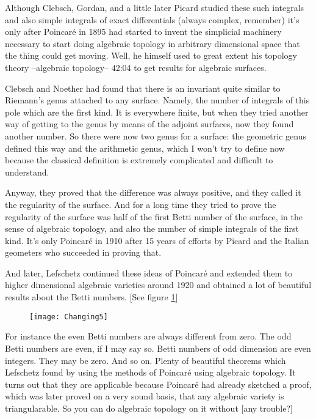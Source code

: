 \documentclass{article}
\begin{document}
Although Clebsch, Gordan, and a little later Picard studied these such integrals
and also simple integrals of exact differentials
(always complex, remember)
it's only after Poincar\'e in 1895 had started to invent the simplicial machinery
necessary to start doing algebraic topology in arbitrary dimensional space 
that the thing could get moving.
Well, he himself used to great extent his topology theory
--algebraic topology--
42:04
to get results for algebraic surfaces.

Clebsch and Noether had found that 
there is an invariant quite similar to Riemann's genus 
attached to any surface.
Namely, the number of integrals of this pole which are the first kind.
It is everywhere finite,
but when they tried another way of getting to the genus 
by means of the adjoint surfaces,
now they found another number.
So there were now two genus for a surface:
the geometric genus defined this way
and the arithmetic genus, 
which I won't try to define now because 
the classical definition is extremely complicated and difficult to understand.

Anyway, they proved that the difference was always positive,
and they called it the regularity of the surface.
And for a long time they tried to prove the regularity of the surface
was half of the first Betti number of the surface,
in the sense of algebraic topology,
and also the number of simple integrals of the first kind.
It's only Poincar\'e in 1910 after 15 years of efforts
by Picard and the Italian geometers
who succeeded in proving that.

And later, Lefschetz continued these ideas of Poincar\'e
and extended them to higher dimensional algebraic varieties
around 1920
and obtained a lot of beautiful results about the Betti numbers.  [See figure \ref{fig:changing5}] 


\begin{figure}[ht]
\caption{}
\label{fig:changing5}
\centering
\texttt{[image: Changing5]}
\end{figure}

For instance the even Betti numbers are always different from zero.
The odd Betti numbers are even, if I may say so.
Betti numbers of odd dimension are even integers. 
They may be zero.
And so on.
Plenty of beautiful theorems which Lefschetz found
by using the methods of Poincar\'e using algebraic topology.
It turns out that they are applicable
because Poincar\'e had already sketched a proof,
which was later proved on a very sound basis,
that any algebraic variety is triangularable.
So you can do algebraic topology on it without [any trouble?]
\end{document}
